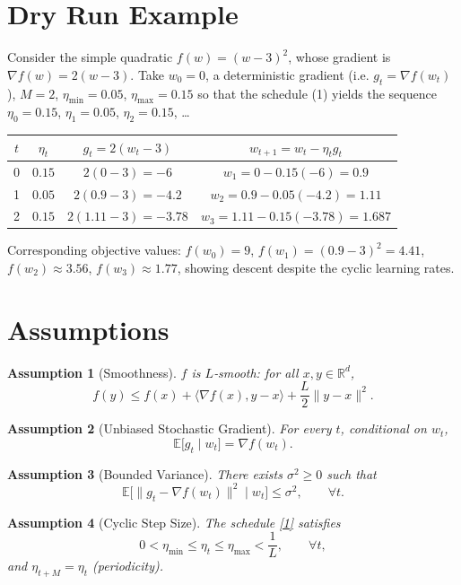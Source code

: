 \documentclass{article}
\newtheorem{assumption}{Assumption}
\newcommand{\E}{\mathbb{E}}
\newcommand{\R}{\mathbb{R}}
\begin{document}
\section*{Dry Run Example}
Consider the simple quadratic $f(w)=(w-3)^{2}$, whose gradient is $\nabla f(w)=2(w-3)$.  
Take $w_{0}=0$, a deterministic gradient (i.e. $g_{t}=\nabla f(w_{t})$), $M=2$, $\eta_{\min}=0.05$, $\eta_{\max}=0.15$
so that the schedule (1) yields the sequence $\eta_{0}=0.15$, $\eta_{1}=0.05$, $\eta_{2}=0.15$, …  

\begin{tabular}{c|c|c|c}
$t$ & $\eta_{t}$ & $g_{t}=2(w_{t}-3)$ & $w_{t+1}=w_{t}-\eta_{t}g_{t}$ \\ \hline
0 & $0.15$ & $2(0-3)=-6$ & $w_{1}=0-0.15(-6)=0.9$ \\
1 & $0.05$ & $2(0.9-3)=-4.2$ & $w_{2}=0.9-0.05(-4.2)=1.11$ \\
2 & $0.15$ & $2(1.11-3)=-3.78$ & $w_{3}=1.11-0.15(-3.78)=1.687$ 
\end{tabular}

Corresponding objective values: $f(w_{0})=9$, $f(w_{1})=(0.9-3)^{2}=4.41$, $f(w_{2})\approx3.56$, $f(w_{3})\approx1.77$,
showing descent despite the cyclic learning rates.

\newpage

\section*{Assumptions}
\begin{assumption}[Smoothness]\label{as:smooth}
$f$ is $L$‑smooth: for all $x,y\in\R^{d}$,
\[
f(y)\le f(x)+\langle \nabla f(x),y-x\rangle+\frac{L}{2}\|y-x\|^{2}.
\]
\end{assumption}
\begin{assumption}[Unbiased Stochastic Gradient]\label{as:unbiased}
For every $t$, conditional on $w_{t}$,
\[
\E\!\big[ g_{t}\mid w_{t}\big]=\nabla f(w_{t}).
\]
\end{assumption}
\begin{assumption}[Bounded Variance]\label{as:variance}
There exists $\sigma^{2}\ge0$ such that
\[
\E\!\big[\|g_{t}-\nabla f(w_{t})\|^{2}\mid w_{t}\big]\le\sigma^{2},
\qquad\forall t.
\]
\end{assumption}
\begin{assumption}[Cyclic Step Size]\label{as:cyclic}
The schedule \eqref{1} satisfies
\[
0<\eta_{\min}\le \eta_{t}\le \eta_{\max}<\frac{1}{L},
\qquad\forall t,
\]
and $\eta_{t+M}=\eta_{t}$ (periodicity).
\end{assumption}
\end{document}
